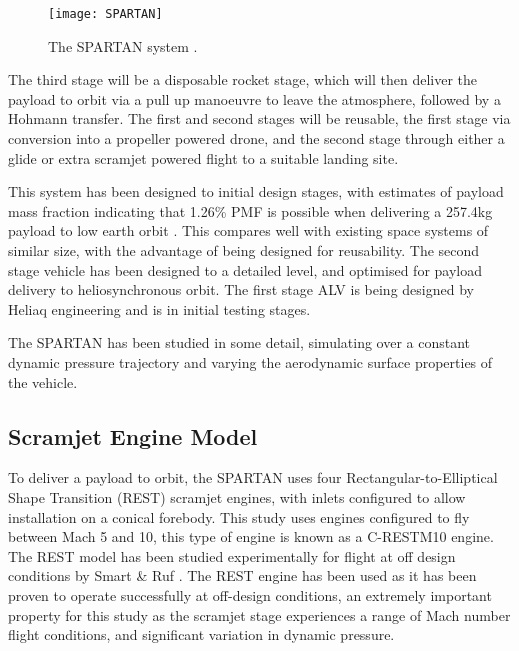 \begin{figure}[ht]
	\centering
	\texttt{[image: SPARTAN]}
	\caption{The SPARTAN system \cite{Jazra2013}.}
	\label{fig:SPARTAN}
\end{figure}

The third stage will be a disposable rocket stage, which will then deliver the payload to orbit via a pull up manoeuvre to leave the atmosphere, followed by a Hohmann transfer. The first and second stages will be reusable, the first stage via conversion into a propeller powered drone, and the second stage through either a glide or extra scramjet powered flight to a suitable landing site. 

This system has been designed to initial design stages, with estimates of  payload mass fraction indicating that 1.26\% PMF is possible when delivering a 257.4kg payload to low earth orbit \cite{Preller2015a}. This compares well with existing space systems of similar size, with the advantage of being designed for reusability. The second stage vehicle has been designed to a detailed level, and optimised for payload delivery to heliosynchronous orbit. The first stage ALV is being designed by Heliaq engineering and is in initial testing stages.

The SPARTAN has been studied in some detail, simulating over a constant dynamic pressure trajectory and varying the aerodynamic surface properties of the vehicle. 

\subsection{Scramjet Engine Model}
To deliver a payload to orbit, the SPARTAN uses four Rectangular-to-Elliptical Shape Transition (REST) scramjet engines, with inlets configured to allow installation on a conical forebody. This study uses engines configured to fly between Mach 5 and 10, this type of engine is known as a C-RESTM10 engine\cite{Preller2017}. The REST model has been studied experimentally for flight at off design conditions by Smart \& Ruf \cite{Smart2006}. The REST engine has been used as it has been proven to operate successfully at off-design conditions, an extremely important property for this study as the scramjet stage experiences a range of Mach number flight conditions, and significant variation in dynamic pressure.  

